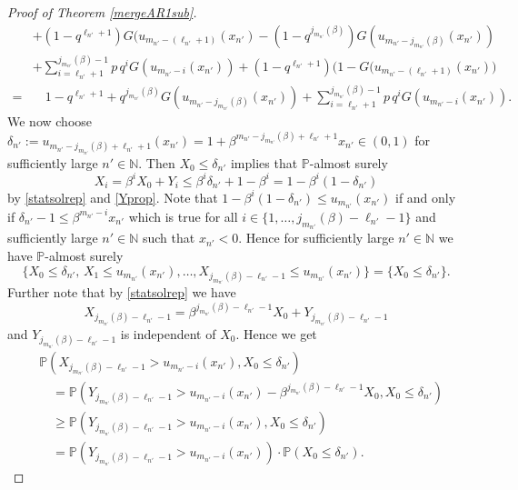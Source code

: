 \documentclass[12pt]{amsart}
\theoremstyle{definition}
\theoremstyle{remark}
\newcommand{\nat}{{\mathbb N}}
\newcommand{\Pm}{{\mathbb P}}
\numberwithin{equation}{section}
\begin{document}
\begin{proof}[Proof of Theorem \ref{mergeAR1sub}]
\begin{equation}
\begin{split}
& +(1-q^{\ell_{n'}+1})G(u_{m_{n'}-(\ell_{n'}+1)}(x_{n'})-(1-q^{j_{m_{n'}}(\beta)})G(u_{m_{n'}-j_{m_{n'}}(\beta)}(x_{n'}))\\
& +\sum_{i=\ell_{n'}+1}^{j_{m_{n'}}(\beta)-1} p\,q^i G(u_{m_{n'}-i}(x_{n'}))+ (1-q^{\ell_{n'}+1})\big(1-G(u_{m_{n'}-(\ell_{n'}+1)}(x_{n'})\big)\\
= & \quad 1-q^{\ell_{n'}+1}+q^{j_{m_{n'}}(\beta)}G(u_{m_{n'}-j_{m_{n'}}(\beta)}(x_{n'}))+\sum_{i=\ell_{n'}+1}^{j_{m_{n'}}(\beta)-1} p\,q^i G(u_{m_{n'}-i}(x_{n'})).
\end{split}\end{equation}
We now choose $\delta_{n'}:=u_{m_{n'}-j_{m_{n'}}(\beta)+\ell_{n'}+1}(x_{n'})=1+\beta^{m_{n'}-j_{m_{n'}}(\beta)+\ell_{n'}+1}x_{n'}\in(0,1)$ for sufficiently large $n'\in\nat$. Then $X_0\leq\delta_{n'}$ implies that $\Pm$-almost surely
$$X_i=\beta^i X_0+Y_i\leq\beta^i\delta_{n'}+1-\beta^i=1-\beta^i(1-\delta_{n'})$$
by \eqref{statsolrep} and \eqref{Yprop}. Note that $1-\beta^i(1-\delta_{n'})\leq u_{m_{n'}}(x_{n'})$ if and only if $\delta_{n'}-1\leq\beta^{m_{n'}-i}x_{n'}$ which is true for all $i\in\{1,\ldots,j_{m_{n'}}(\beta)-\ell_{n'}-1\}$ and sufficiently large $n'\in\nat$ such that $x_{n'}<0$. Hence for sufficiently large $n'\in\nat$ we have $\Pm$-almost surely
\begin{equation}\label{X0rel}
\{X_0\leq \delta_{n'},\,X_1\leq u_{m_{n'}}(x_{n'}),\ldots,X_{j_{m_{n'}}(\beta)-\ell_{n'}-1}\leq u_{m_{n'}}(x_{n'})\}=\{X_0\leq \delta_{n'}\}.
\end{equation}
Further note that by \eqref{statsolrep} we have
$$X_{j_{m_{n'}}(\beta)-\ell_{n'}-1}=\beta^{j_{m_{n'}}(\beta)-\ell_{n'}-1}X_{0}+Y_{j_{m_{n'}}(\beta)-\ell_{n'}-1}$$
and $Y_{j_{m_{n'}}(\beta)-\ell_{n'}-1}$ is independent of $X_{0}$. Hence we get
\begin{equation}\label{Pcompl}\begin{split}
& \Pm\left(X_{j_{m_{n'}}(\beta)-\ell_{n'}-1}>u_{m_{n'}-i}(x_{n'}), X_{0}\leq\delta_{n'}\right)\\
& \quad=\Pm\left(Y_{j_{m_{n'}}(\beta)-\ell_{n'}-1}>u_{m_{n'}-i}(x_{n'})-\beta^{j_{m_{n'}}(\beta)-\ell_{n'}-1}X_{0}, X_{0}\leq\delta_{n'}\right)\\
& \quad\geq\Pm\left(Y_{j_{m_{n'}}(\beta)-\ell_{n'}-1}>u_{m_{n'}-i}(x_{n'}), X_{0}\leq\delta_{n'}\right)\\
& \quad=\Pm\left(Y_{j_{m_{n'}}(\beta)-\ell_{n'}-1}>u_{m_{n'}-i}(x_{n'})\right)\cdot\Pm\left(X_{0}\leq\delta_{n'}\right).
\end{split}\end{equation}

\end{proof}
\end{document}
